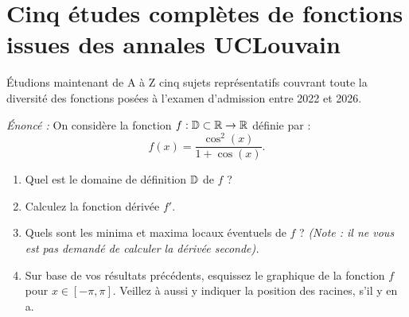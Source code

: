 \section{Cinq études complètes de fonctions issues des annales UCLouvain}

Étudions maintenant de A à Z cinq sujets représentatifs couvrant toute la diversité des fonctions posées à l'examen d'admission entre 2022 et 2026.

\begin{exemple}
\emph{Énoncé :} On considère la fonction $f : \mathbb{D} \subset \mathbb{R} \to \mathbb{R}$ définie par :
\[
    f(x) = \frac{\cos^2(x)}{1 + \cos(x)}.
\]
\begin{enumerate}[label=\alph*)]
    \item Quel est le domaine de définition $\mathbb{D}$ de $f$ ?
    \item Calculez la fonction dérivée $f'$.
    \item Quels sont les minima et maxima locaux éventuels de $f$ ? \emph{(Note : il ne vous est pas demandé de calculer la dérivée seconde).}
    \item Sur base de vos résultats précédents, esquissez le graphique de la fonction $f$ pour $x \in [-\pi, \pi]$. Veillez à aussi y indiquer la position des racines, s'il y en a.
\end{enumerate}


\end{exemple}
